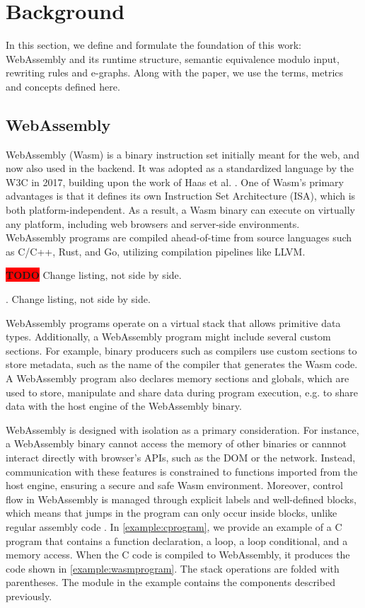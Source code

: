 \documentclass[sigplan,screen]{acmart}
\newcommand*\badge[1]{ \colorbox{red}{\color{white}#1}}
\newcommand{\todo}[1]{%
\refstepcounter{todo}
\noindent\textbf{\badge{TODO}} {\color{red}#1}
\addcontentsline{td}{todo}
{\color{red}\thesection.\thetodo\xspace #1}}
\begin{document}
\section{Background}
\label{background}

In this section, we define and formulate the foundation of this work: WebAssembly and its runtime structure, semantic equivalence modulo input, rewriting rules and e-graphs.
Along with the paper, we use the terms, metrics and concepts defined here.

\subsection{WebAssembly}

WebAssembly (Wasm) is a binary instruction set initially  meant for the web, and now also used in the backend. 
It was adopted as a standardized language by the W3C in 2017, building upon the work of Haas et al. \cite{haas2017bringing}. One of Wasm's primary advantages is that it defines its own Instruction Set Architecture (ISA), which is both platform-independent. As a result, a Wasm binary can execute on virtually any platform, including web browsers and server-side environments. 
WebAssembly programs are compiled ahead-of-time from source languages such as C/C++, Rust, and Go, utilizing compilation pipelines like LLVM. 

\todo{Change listing, not side by side.}



WebAssembly programs operate on a virtual stack that allows primitive data types.
Additionally, a WebAssembly program might include several custom sections.
For example, binary producers such as compilers use custom sections to store metadata, such as the name of the compiler that generates the Wasm code.
A WebAssembly program also declares memory sections and globals, which are used to store, manipulate and share data during program execution, e.g. to share data with the host engine of the WebAssembly binary.

WebAssembly is designed with isolation as a primary consideration. For instance, a WebAssembly binary cannot access the memory of other binaries or cannnot interact directly with browser's APIs, such as the DOM or the network. Instead, communication with these features is constrained to functions imported from the host engine, ensuring a secure and safe Wasm environment.
Moreover, control flow in WebAssembly is managed through explicit labels and well-defined blocks, which means that jumps in the program can only occur inside blocks, unlike regular assembly code \cite{10.1145/3062341.3062363}. 
In \autoref{example:cprogram}, we provide an example of a C program that contains a function declaration, a loop, a loop conditional, and a memory access. When the C code is compiled to WebAssembly, it produces the code shown in \autoref{example:wasmprogram}. The stack operations are folded with parentheses.
The module in the example contains the components described previously.
\end{document}
